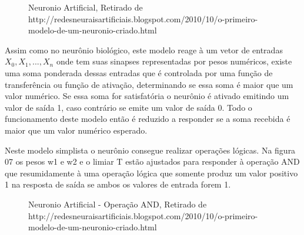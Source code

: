 \documentclass[	12pt, Times, openright, twoside, a4paper, english, brazil]{abntex2}
\begin{document}
            \begin{figure}[!ht]
                \caption{Neuronio Artificial, Retirado de http://redesneuraisartificiais.blogspot.com/2010/10/o-primeiro-modelo-de-um-neuronio-criado.html\label{fig:NeuronioArtificial}}
            \end{figure}

            Assim como no neurônio biológico, este modelo reage à um vetor de entradas $X_0,X_1,...,X_n$ onde tem suas sinapses representadas por pesos numéricos, existe uma soma ponderada dessas entradas que é controlada por uma função de transferência ou função de ativação, determinando se essa soma é maior que um valor numérico. Se essa soma for satisfatória o neurônio é ativado emitindo um valor de saída 1, caso contrário se emite um valor de saída 0.
            Todo o funcionamento deste modelo então é reduzido a responder se a soma recebida é maior que um valor numérico esperado.

            Neste modelo simplista o neurônio consegue realizar operações lógicas. Na figura 07 os pesos w1 e w2 e o limiar T estão ajustados para responder à operação AND que resumidamente à uma operação lógica que somente produz um valor positivo 1 na resposta de saída se ambos os valores de entrada forem 1.

            \begin{figure}[!ht]
              \caption{Neuronio Artificial - Operação AND, Retirado de http://redesneuraisartificiais.blogspot.com/2010/10/o-primeiro-modelo-de-um-neuronio-criado.html\label{fig:NeuronioArtificialAnd}}
            \end{figure}
\end{document}
